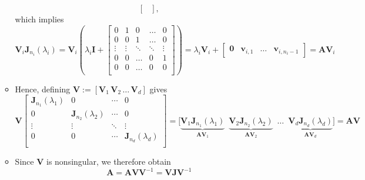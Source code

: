 \documentclass[12pt,a4paper]{article}
\begin{document}
\begin{itemize}
\begin{itemize}
\begin{equation}
\begin{bmatrix}
      \end{bmatrix},
    \end{equation}
    which implies
    \begin{equation}
      \bm{V}_{i} \bm{J}_{n_{i}}(\lambda_{i})
      = \bm{V}_{i} \left(\lambda_{i}\bm{I}
        +
        \begin{bmatrix}
          0 & 1 & 0 & \ldots & 0 \\
          0 & 0 & 1 & \ldots & 0 \\
          \vdots & \vdots & \ddots & \ddots & \vdots \\
          0 & 0 & \ldots & 0 & 1 \\
          0 & 0 & \ldots & 0 & 0 \\
        \end{bmatrix}
        \right)
      = \lambda_{i}\bm{V}_{i} + 
      \begin{bmatrix}
        \bm{0} & \bm{v}_{i,1} & \ldots & \bm{v}_{i,n_{i}-1}
      \end{bmatrix}
      = \bm{A}\bm{V}_{i}
    \nonumber%
    \end{equation}
  \item Hence, defining $\bm{V}:=[\bm{V}_{1}\, \bm{V}_{2} \, \ldots \, \bm{V}_{d}]$ gives 
    \begin{equation}\nonumber
      \bm{V}
      \begin{bmatrix}
        \bm{J}_{n_{1}}(\lambda_{1}) & 0 & \cdots & 0 \\
        0 & \bm{J}_{n_{2}}(\lambda_{2}) & \cdots & 0 \\
        \vdots & \vdots & \ddots & \vdots \\
        0 & 0 & \cdots & \bm{J}_{n_{d}}(\lambda_{d}) \\
      \end{bmatrix}
      =
        \big[
        \underbrace{\bm{V}_{1}\bm{J}_{n_{1}}(\lambda_{1})}_{\bm{A}\bm{V}_{1}}
        \,\,\,
        \underbrace{\bm{V}_{2}\bm{J}_{n_{2}}(\lambda_{2})}_{\bm{A}\bm{V}_{2}}
        \,\,\,
        \ldots
        \,\,\,
        \underbrace{\bm{V}_{d}\bm{J}_{n_{d}}(\lambda_{d})}_{\bm{A}\bm{V}_{d}}
        \big]
        = \bm{A} \bm{V}
    \end{equation}
  \item Since $\bm{V}$ is nonsingular, we therefore obtain
    \begin{equation}\nonumber%
      \bm{A} = \bm{A}\bm{V}\bm{V}^{-1} = \bm{V}\bm{J}\bm{V}^{-1}
    \end{equation}
  \end{itemize}

\end{itemize}
\end{document}
